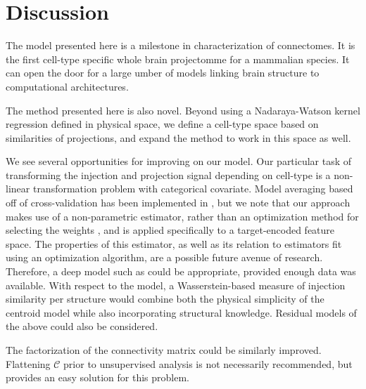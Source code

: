 \section{Discussion}

The model presented here is a milestone in characterization of connectomes. It is the first cell-type specific whole brain projectomme for a mammalian species. It can open the door for a large umber of models linking brain structure to computational architectures. 

The method presented here is also novel. Beyond using a Nadaraya-Watson kernel regression defined in physical space, we define a cell-type space based on similarities of projections, and expand the method to work in this space as well. 

We see several opportunities for improving on our model.
Our particular task of transforming the injection and projection signal depending on cell-type is a non-linear transformation problem with categorical covariate.
Model averaging based off of cross-validation has been implemented in \citet{Gao2016-qe}, but we note that our approach makes use of a non-parametric estimator, rather than an optimization method for selecting the weights \citep{Saul2003-th}, and is applied specifically to a target-encoded feature space.
The properties of this estimator, as well as its relation to estimators fit using an optimization algorithm, are a possible future avenue of research.
Therefore, a deep model such as \citet{Lotfollahi2019-tr} could be appropriate, provided enough data was available.
With respect to the model, a Wasserstein-based measure of injection similarity per structure would combine both the physical simplicity of the centroid model while also incorporating structural knowledge.
Residual models of the above could also be considered.

The factorization of the connectivity matrix could be similarly improved.
Flattening $\mathcal C$ prior to unsupervised analysis is not necessarily recommended, but provides an easy solution for this problem.



